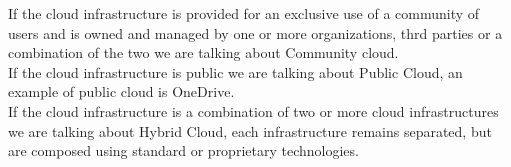 If the cloud infrastructure is provided for an exclusive use of a community of users and is owned and managed by one or more organizations, thrd parties or a combination of the two we are talking about Community cloud. \\
If the cloud infrastructure is public we are talking about Public Cloud, an example of public cloud is OneDrive. \\
If the cloud infrastructure is a combination of two or more cloud infrastructures we are talking about Hybrid Cloud, each infrastructure remains separated, but are composed using standard or proprietary technologies. \\